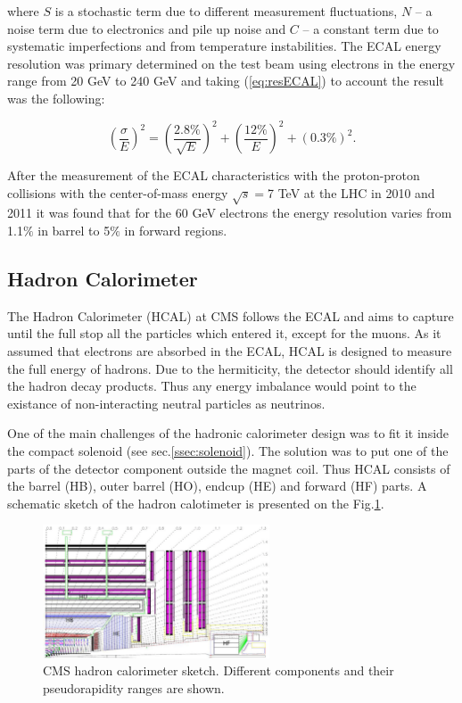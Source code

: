 where $S$ is a stochastic term due to different measurement fluctuations, $N$ -- a noise term due to electronics and pile up noise
and $C$ -- a constant term due to systematic imperfections and from temperature instabilities. 
The ECAL energy resolution was primary determined on the test beam using 
electrons in the energy range from 20 GeV to 240 GeV\cite{ECALres2007} and taking (\ref{eq:resECAL}) to account the result was the
following:

\begin{equation}\label{eq:resECAL}
  (\frac{\sigma}{E})^{2} = (\frac{2.8\%}{\sqrt{E}})^{2} + (\frac{12\%}{E})^{2} + (0.3\%)^{2}.
\end{equation}

After the measurement of the ECAL characteristics with the proton-proton collisions with the center-of-mass energy $\sqrt{s} = $7 TeV
at the LHC in 2010 and 2011 it was found that for the 60 GeV electrons the energy resolution varies from 1.1$\%$ in barrel to 5$\%$ in 
forward regions\cite{ECALres2013}.

\subsection{Hadron Calorimeter}

The Hadron Calorimeter (HCAL)\cite{CMSatLHC} at CMS follows the ECAL and aims to capture until the full stop all the particles which entered it, 
except for the muons. As it assumed that electrons are absorbed in the ECAL, HCAL is designed to measure the full energy of hadrons. 
Due to the hermiticity, the detector should identify all the hadron decay products. Thus any energy imbalance would point to the
existance of non-interacting neutral particles as neutrinos.

One of the main challenges of the hadronic calorimeter design was to fit it inside the compact solenoid (see sec.\ref{ssec:solenoid}).
The solution was to put one of the parts of the detector component outside the magnet coil. Thus HCAL consists of the barrel (HB), 
outer barrel (HO), endcup (HE) and forward (HF) parts. A schematic sketch of the hadron calotimeter is presented on the Fig.\ref{fig:hcal}.

\begin{figure}[t]
  \centering
  \includegraphics[width=0.6\textwidth]{02_experimental_setup/plots/Figures_Experimental_Apparatus_HCAL.png}
  \caption{CMS hadron calorimeter sketch. Different components and their pseudorapidity ranges are shown.}
  \label{fig:hcal}
\end{figure}

